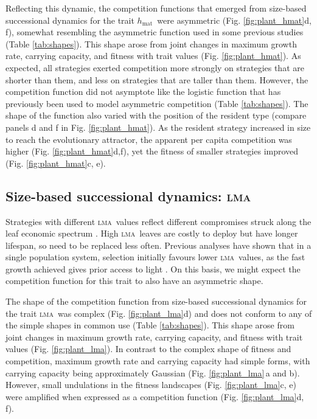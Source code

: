 \documentclass[a4paper,11pt]{article}
\newcommand{\hmat}{\ensuremath{h_{\text{mat}}}}
\newcommand{\lma}{\textsc{lma}}
\begin{document}
Reflecting this dynamic, the competition functions that emerged from size-based successional dynamics for the trait \hmat\ were asymmetric (Fig. \ref{fig:plant_hmat}d, f), somewhat resembling the asymmetric function used in some previous studies \citep{Law-1997, Kisdi-1999, Geritz-1999, Egas-2004, Calcagno-2006, DAndrea-2013} (Table \ref{tab:shapes}). This shape arose from joint changes in maximum growth rate, carrying capacity, and fitness with trait values (Fig. \ref{fig:plant_hmat}). As expected, all strategies exerted competition more strongly on strategies that are shorter than them, and less on strategies that are taller than them. However, the competition function did not asymptote like the logistic function that has previously been used to model asymmetric competition (Table \ref{tab:shapes}). The shape of the function also varied with the position of the resident type (compare panels d and f in Fig. \ref{fig:plant_hmat}). As the resident strategy increased in size to reach the evolutionary attractor, the apparent per capita competition was higher (Fig. \ref{fig:plant_hmat}d,f), yet the fitness of smaller strategies improved (Fig. \ref{fig:plant_hmat}c, e).

\subsection{Size-based successional dynamics: \lma}

Strategies with different \lma\ values reflect different compromises struck along the leaf economic spectrum \citep{Reich-1997,Wright-2004}. High \lma\ leaves are costly to deploy but have longer lifespan, so need to be replaced less often. Previous analyses have shown that in a single population system, selection initially favours lower \lma\ values, as the fast growth achieved gives prior access to light \citep{Falster-2017}. On this basis, we might expect the competition function for this trait to also have an asymmetric shape.

The shape of the competition function from size-based successional dynamics for the trait \lma\ was complex (Fig. \ref{fig:plant_lma}d) and does not conform to any of the simple shapes in common use (Table \ref{tab:shapes}). This shape arose from joint changes in maximum growth rate, carrying capacity, and fitness with trait values (Fig. \ref{fig:plant_lma}). In contrast to the complex shape of fitness and competition, maximum growth rate and carrying capacity had simple forms, with carrying capacity being approximately Gaussian (Fig. \ref{fig:plant_lma}\,a and b). However, small undulations in the fitness landscapes (Fig. \ref{fig:plant_lma}c, e) were amplified when expressed as a competition function (Fig. \ref{fig:plant_lma}d, f). 
\end{document}
